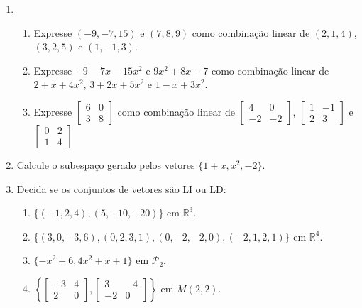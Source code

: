 \documentclass{article}
\begin{document}
\begin{enumerate}
\item
	\begin{enumerate}
		\item Expresse $(-9, -7, 15)$ e $(7, 8, 9)$ como combina\c{c}\~ao linear de
			$(2, 1, 4)$, $(3, 2, 5)$ e $(1, -1, 3)$.
		\item Expresse $-9-7x-15x^2$ e $9x^2+8x+7$ como combina\c{c}\~ao linear de
			$2+x+4x^2$, $3+2x+5x^2$ e $1-x+3x^2$.
		\item Expresse
			$\left[\begin{array}{cc}
					6 & 0 \\
					3 & 8
				\end{array}\right]$
			como combina\c{c}\~ao linear de
			$\left[\begin{array}{cc}
					4 & 0 \\
					-2 & -2
				\end{array}\right]$, 
			$\left[\begin{array}{cc}
					1 & -1 \\
					2 & 3
				\end{array}\right]$ e 
			$\left[\begin{array}{cc}
					0 & 2 \\
					1 & 4
				\end{array}\right]$
	\end{enumerate}

\item Calcule o subespa\c{c}o gerado pelos vetores $\{1+x, x^2, -2\}$.

\item Decida se os conjuntos de vetores s\~ao LI ou LD:
	\begin{enumerate}
		\item $\{(-1, 2, 4), (5, -10, -20)\}$ em $\mathbb{R}^3$.
		\item $\{(3, 0, -3, 6), (0, 2, 3, 1), (0, -2, -2, 0), (-2, 1, 2, 1)\}$ em $\mathbb{R}^4$.
		\item $\{-x^2+6, 4x^2+x+1\}$ em $\mathcal{P}_2$.
		\item $\left\{
			\left[\begin{array}{cc}
				-3 & 4 \\
				2 & 0
			\end{array}\right], 
			\left[\begin{array}{cc}
				3 & -4 \\
				-2 & 0
			\end{array}\right]\right\}$
		em $M(2, 2)$.
	\end{enumerate}


\end{enumerate}
\end{document}

